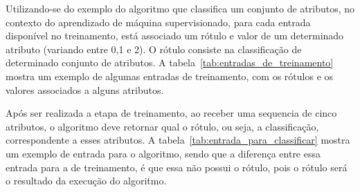 Utilizando-se do exemplo do algoritmo que classifica um conjunto de atributos,
no contexto do aprendizado de máquina supervisionado, para cada entrada
disponível no treinamento, está associado um rótulo e valor de um determinado
atributo (variando entre 0,1 e 2). O rótulo consiste na classificação de
determinado conjunto de atributos. A tabela~\ref{tab:entradas_de_treinamento}
mostra um exemplo de algumas entradas de treinamento, com os rótulos e os
valores associados a alguns atributos.

\begin{table}[h]
\centering
{}
\caption{Entradas de treinamento para o aprendizado de máquina}
\label{tab:entradas_de_treinamento}
\end{table}

Após ser realizada a etapa de treinamento, ao receber uma sequencia de cinco
atributos, o algoritmo deve retornar qual o rótulo, ou seja, a classificação,
correspondente a esses atributos. A tabela~\ref{tab:entrada_para_classificar}
mostra um exemplo de entrada para o algoritmo, sendo que a diferença entre
essa entrada para a de treinamento, é que essa não possui o rótulo, pois o rótulo será o resultado
da execução do algoritmo.

\begin{table}[h]
\centering
{}
\caption{Entrada de dados para o algoritmo determinar o rótulo}
\label{tab:entrada_para_classificar}
\end{table}


